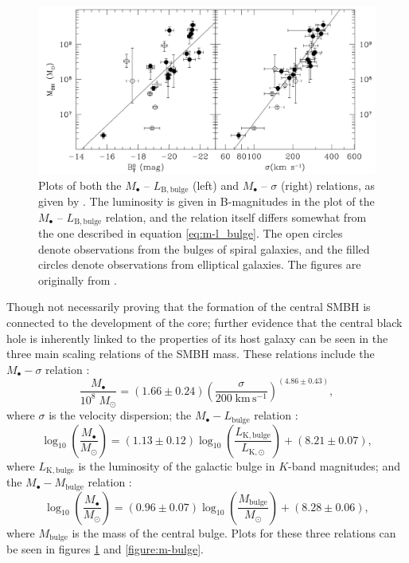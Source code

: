 \documentclass[english, oneside]{HYgradu}
\begin{document}
\begin{figure}
	\centering
	\includegraphics[width=\textwidth]{ferrarese_m-sigma.png}
	\caption{Plots of both the $M_\bullet$ – $L_\mathrm{B,bulge}$ (left) and $M_\bullet$ – $\sigma$ (right) relations, as given by \cite{Ferrarese2005}. The luminosity is given in B-magnitudes in the plot of the $M_\bullet$ – $L_\mathrm{B,bulge}$ relation, and the relation itself differs somewhat from the one described in equation \ref{eq:m-l_bulge}. The open circles denote observations from the bulges of spiral galaxies, and the filled circles denote observations from elliptical galaxies. The figures are originally from \cite{Ferrarese2005}.}
	\label{figure:m-sigma}
\end{figure}

Though not necessarily proving that the formation of the central SMBH is connected to the development of the core; further evidence that the central black hole is inherently linked to the properties of its host galaxy can be seen in the three main scaling relations of the SMBH mass. These relations include the $M_\bullet - \sigma$ relation \citep{Ferrarese2005}:
\begin{equation}
\frac{M_\bullet}{10^8 \; M_\odot} = (1.66 \pm 0.24) \left( \frac{\sigma}{200 \; \mathrm{km \, s^{-1}}} \right)^{(4.86\pm0.43)}, \label{eq:m-sigma}
\end{equation}
where $\sigma$ is the velocity dispersion; the $M_\bullet - L_\mathrm{bulge}$ relation \citep{Marconi2003}:
\begin{equation}
\log_{10} \left( \frac{M_\bullet}{M_\odot} \right) = (1.13 \pm 0.12) \log_{10} \left( \frac{L_\mathrm{K,bulge}}{L_\mathrm{K,\odot}} \right) + (8.21 \pm 0.07), \label{eq:m-l_bulge}
\end{equation}
where $L_\mathrm{K,bulge}$ is the luminosity of the galactic bulge in $K$-band magnitudes; and the $M_\bullet - M_\mathrm{bulge}$ relation \citep{Marconi2003}:
\begin{equation}
\log_{10} \left( \frac{M_\bullet}{M_\odot} \right) = (0.96 \pm 0.07) \log_{10} \left( \frac{M_\mathrm{bulge}}{M_\odot} \right) + (8.28 \pm 0.06), \label{eq:m-m_bulge}
\end{equation}
where $M_\mathrm{bulge}$ is the mass of the central bulge. Plots for these three relations can be seen in figures \ref{figure:m-sigma} and \ref{figure:m-bulge}. 
\end{document}
